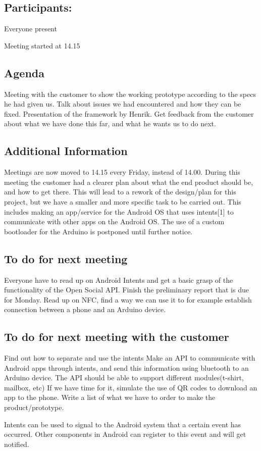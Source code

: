 \subsection{Participants:}
 Everyone present

Meeting started at 14.15


\subsection{Agenda}
Meeting with the customer to show the working prototype according to the specs he had given us.
Talk about issues we had encountered and how they can be fixed.
Presentation of the framework by Henrik.
Get feedback from the customer about what we have done this far, and what he wants us to do next.


\subsection{Additional Information}
Meetings are now moved to 14.15 every Friday, instead of 14.00.
During this meeting the customer had a clearer plan about what the end product should be, and how to get there. This will lead to a rework of the design/plan for this project, but we have a smaller and more specific task to be carried out. This includes making an app/service for the Android OS that uses intents[1] to communicate with other apps on the Android OS.
The use of a custom bootloader for the Arduino is postponed until further notice.


\subsection{ To do for next meeting}
Everyone have to read up on Android Intents and get a basic grasp of the functionality of the Open Social API.
Finish the preliminary report that is due for Monday.
Read up on NFC, find a way we can use it to for example establish connection between a phone and an Arduino device.


\subsection{ To do for next meeting with the customer}
Find out how to separate and use the intents
Make an API to communicate with Android apps through intents, and send this information using bluetooth to an Arduino device.
The API should be able to support different modules(t-shirt, mailbox, etc)
If we have time for it, simulate the use of QR codes to download an app to the phone.
Write a list of what we have to order to make the product/prototype.

Intents can be used to signal to the Android system that a certain event has occurred. Other components in Android can register to this event and will get notified.